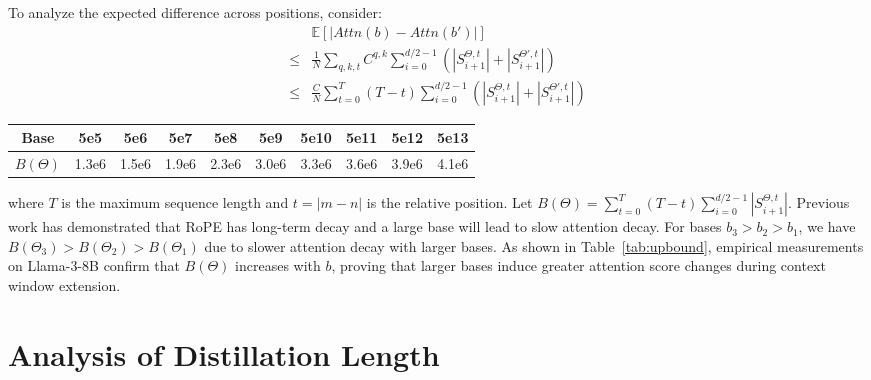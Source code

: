 To analyze the expected difference across positions, consider:
\begin{align}
&\mathbb{E}\left[\left| \textit{Attn}(b) - \textit{Attn}(b') \right|\right] \\
\leq & \frac{1}{N} \sum_{q,k,t} C^{q,k} \sum_{i=0}^{d/2-1} \left(|S^{\Theta,t}_{i+1}| + |S^{\Theta',t}_{i+1}|\right) \\
\leq & \frac{C}{N} \sum_{t=0}^{T} (T-t) \sum_{i=0}^{d/2-1} \left(|S^{\Theta,t}_{i+1}| + |S^{\Theta',t}_{i+1}|\right)
\end{align}

\begin{table*}[htb]
    \centering
    \begin{tabular}{cccccccccc}
    \toprule
         Base&  5e5&  5e6&  5e7&  5e8&  5e9&  5e10&  5e11&  5e12& 5e13\\\midrule
         $B(\Theta)$&  1.3e6&  1.5e6&  1.9e6&  2.3e6&  3.0e6&  3.3e6&  3.6e6&  3.9e6& 4.1e6\\\bottomrule
    \end{tabular}
    \caption{Upper bound of different RoPE bases.}
    \label{tab:upbound}
\end{table*}


where $T$ is the maximum sequence length and $t = |m-n|$ is the relative position. Let $B(\Theta) = \sum_{t=0}^{T} (T-t) \sum_{i=0}^{d/2-1} |S^{\Theta,t}_{i+1}|$. Previous work has demonstrated that RoPE has long-term decay and a large base will lead to slow attention decay. For bases $b_3 > b_2 > b_1$, we have $B(\Theta_3) > B(\Theta_2) > B(\Theta_1)$ due to slower attention decay with larger bases. As shown in Table~\ref{tab:upbound}, empirical measurements on Llama-3-8B confirm that $B(\Theta)$ increases with $b$, proving that larger bases induce greater attention score changes during context window extension.


\section{Analysis of Distillation Length}
\label{app:latent}

